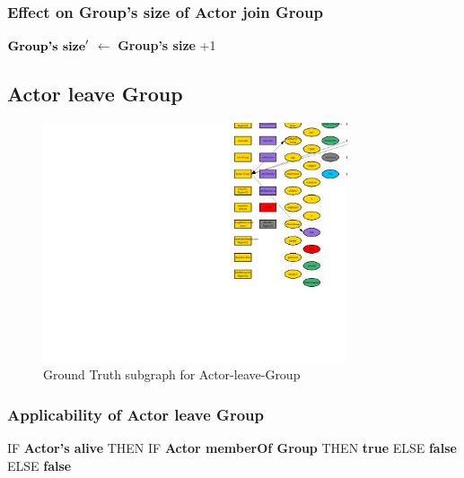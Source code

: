 \documentclass{article}%
\begin{document}
\subsubsection{Effect on Group's size of Actor join Group}%
\label{ssubsec:Effect on Group's size of Actor join Group}%
\begin{flushleft}%
$\mbox{\textbf{Group's size}} '$%
$\leftarrow$%
\textbf{Group's size}%
+1%
\end{flushleft}

%
\subsection{Actor leave Group}%
\label{subsec:Actor leave Group}%


\begin{figure}[ht]%
\centering%
\includegraphics[width=0.8\textwidth]{images/Actor-leave-Group.png}%
\caption{Ground Truth subgraph for Actor{-}leave{-}Group}%
\end{figure}

%
\subsubsection{Applicability of Actor leave Group}%
\label{ssubsec:Applicability of Actor leave Group}%
\begin{flushleft}%
IF %
\textbf{Actor's alive}%
\linebreak%
\hspace*{2em}%
THEN %
IF %
\textbf{Actor memberOf Group}%
\linebreak%
\hspace*{4em}%
THEN %
\textbf{true}%
\linebreak%
\hspace*{4em}%
ELSE %
\textbf{false}%
\linebreak%
\hspace*{2em}%
ELSE %
\textbf{false}%
\end{flushleft}
\end{document}
